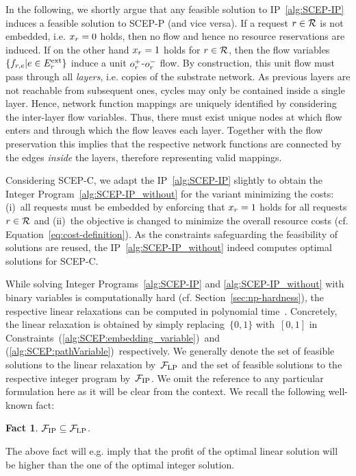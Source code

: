 \documentclass[10pt, conference, letterpaper]{IEEEtran}
\newtheorem{fact}[theorem]{Fact}
\begin{document}
In the following, we shortly argue that any feasible solution to IP~\ref{alg:SCEP-IP} induces a feasible solution to SCEP-P (and vice versa). If a request $r \in \mathcal{R}$ is not embedded, i.e. $x_r = 0$ holds, then no flow and hence no resource reservations are induced. If on the other hand $x_r = 1$ holds for $r \in \mathcal{R}$, then the flow variables $\{f_{r,e} | e \in E^{\textnormal{ext}}_{r}\}$ induce a unit $o^+_{r}$-$o^-_{r}$ flow. By construction, this unit flow must pass through all \emph{layers}, i.e. copies of the substrate network. As previous layers are not reachable from subsequent ones, cycles may only be contained inside a single layer. Hence, network function mappings are uniquely identified by considering the inter-layer flow variables. Thus, there must exist unique nodes at which flow enters and through which the flow leaves each layer. Together with the flow preservation this implies that the respective network functions are connected by the edges \emph{inside} the layers, therefore representing valid mappings.

Considering SCEP-C, we adapt the IP~\ref{alg:SCEP-IP} slightly to obtain the Integer Program~\ref{alg:SCEP-IP_without} for the variant minimizing the costs: (i)~all requests must be embedded by enforcing that $x_r = 1$ holds for all requests $r \in \mathcal{R}$ and (ii)~the objective is changed to minimize the overall resource costs (cf. Equation~\ref{eq:cost-definition}). As the constraints safeguarding the feasibility of solutions are reused, the IP~\ref{alg:SCEP-IP_without} indeed computes optimal solutions for SCEP-C.

While solving Integer Programs~\ref{alg:SCEP-IP} and \ref{alg:SCEP-IP_without} with binary 
variables is computationally hard (cf. Section~\ref{sec:np-hardness}), 
the respective linear relaxations can be computed in polynomial time~\cite{matousek2007understanding}.
Concretely, the linear relaxation is obtained by simply replacing~$\{0,1\}$ with~$[0,1]$ in Constraints~(\ref{alg:SCEP:embedding_variable})~and 
(\ref{alg:SCEP:pathVariable})~respectively. We generally denote the set of feasible solutions to the linear relaxation by~$\mathcal{F}_{\textnormal{LP}}$ and the set of feasible solutions to the respective integer program by~$\mathcal{F}_{\textnormal{IP}}$. We omit the reference to any particular formulation here as it will be clear from the context. We recall the following well-known fact:
\begin{fact}
\label{obs:IP-solutions-are-a-subset-of-LP-solutions}
$\mathcal{F}_{\textnormal{IP}} \subseteq \mathcal{F}_{\textnormal{LP}}$.
\end{fact}
The above fact will e.g. imply that the profit of the optimal linear solution will be higher than the one of the optimal integer solution.
\end{document}

